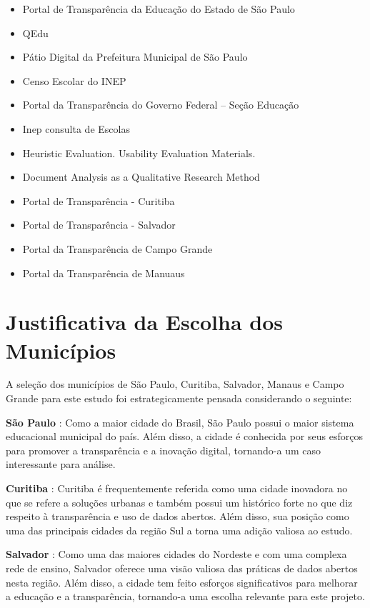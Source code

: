 \begin{itemize}
    \item Portal de Transparência da Educação do Estado de São Paulo \cite{ENAPSP}
    \item QEdu \cite{QEDU}
    \item Pátio Digital da Prefeitura Municipal de São Paulo \cite{PATIODIGITAL}
    \item Censo Escolar do INEP \cite{EDUCACENSO}
    \item Portal da Transparência do Governo Federal – Seção Educação \cite{PORTALTRANSPARENCIA}
    \item Inep consulta de Escolas \cite{CATALOGOESCOLAS}
    \item Heuristic Evaluation. Usability Evaluation Materials. \cite{HE}
    \item Document Analysis as a Qualitative Research Method \cite{DA}
    \item Portal de Transparência - Curitiba \cite{CU}
    \item Portal de Transparência - Salvador \cite{SA}
    \item Portal da Transparência de Campo Grande \cite{CG}
    \item Portal da Transparência de Manuaus \cite{MA}
\end{itemize}

\section{Justificativa da Escolha dos Municípios}

A seleção dos municípios de São Paulo, Curitiba, Salvador, Manaus e Campo Grande para este estudo foi estrategicamente pensada considerando o seguinte:

\textbf{São Paulo} \cite{SP}: Como a maior cidade do Brasil, São Paulo possui o maior sistema educacional municipal do país. Além disso, a cidade é conhecida por seus esforços para promover a transparência e a inovação digital, tornando-a um caso interessante para análise.

\textbf{Curitiba} \cite{CU}: Curitiba é frequentemente referida como uma cidade inovadora no que se refere a soluções urbanas e também possui um histórico forte no que diz respeito à transparência e uso de dados abertos. Além disso, sua posição como uma das principais cidades da região Sul a torna uma adição valiosa ao estudo.

\textbf{Salvador} \cite{SA}: Como uma das maiores cidades do Nordeste e com uma complexa rede de ensino, Salvador oferece uma visão valiosa das práticas de dados abertos nesta região. Além disso, a cidade tem feito esforços significativos para melhorar a educação e a transparência, tornando-a uma escolha relevante para este projeto.

